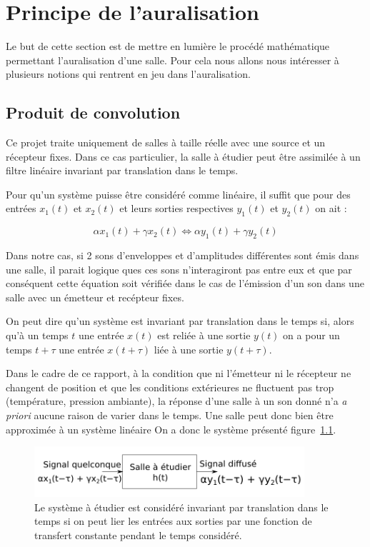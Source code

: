 \chapter{Principe de l'auralisation}

Le but de cette section est de mettre en lumière le procédé mathématique permettant l'auralisation d'une salle. Pour
cela nous allons nous intéresser à plusieurs notions qui rentrent en jeu dans l'auralisation.

\section{Produit de convolution} %
\label{produit_de_convo}

Ce projet traite uniquement de salles à taille réelle avec une source et un récepteur fixes. Dans ce cas particulier, la salle à étudier peut être assimilée à un filtre linéaire invariant par translation dans le temps. 

Pour qu'un système puisse être considéré comme linéaire, il suffit que pour des entrées $x_1(t)$ et $x_2(t)$ et leurs sorties respectives $y_1(t)$ et $y_2(t)$ on ait :
    
\begin{equation}
    \alpha x_1(t) + \gamma x_2(t) \Leftrightarrow \alpha y_1(t) + \gamma y_2(t)
\end{equation}

Dans notre cas, si 2 sons d'enveloppes et d'amplitudes différentes sont émis dans une salle, il parait logique ques ces sons n'interagiront pas entre eux et que par conséquent cette équation soit vérifiée dans le cas de l'émission d'un son dans une salle avec un émetteur et recépteur fixes.

On peut dire qu'un système est invariant par translation dans le temps si, alors qu'à un temps $t$ une entrée $x(t)$ est reliée à une sortie $y(t)$ on a pour un temps $t+\tau$ une entrée $x(t+\tau)$ liée à une sortie $y(t+\tau)$.

Dans le cadre de ce rapport, à la condition que ni l'émetteur ni le récepteur ne changent de position et que les conditions extérieures ne fluctuent pas trop (température, pression ambiante), la réponse d'une salle à un son donné n'a \textit{a priori} aucune raison de varier dans le temps.
Une salle peut donc bien être approximée à un système linéaire
On a donc le système présenté figure~\ref{systeme_lineaire_invariant}.

\begin{figure}[h!]
\begin{center}
\includegraphics[width=10cm]{systeme_lineaire_invariant.png}
\end{center}
\caption{\label{systeme_lineaire_invariant}Le système à étudier est considéré invariant par translation dans le temps si
on peut lier les entrées aux sorties par une fonction de transfert constante pendant le temps considéré.}
\end{figure}


